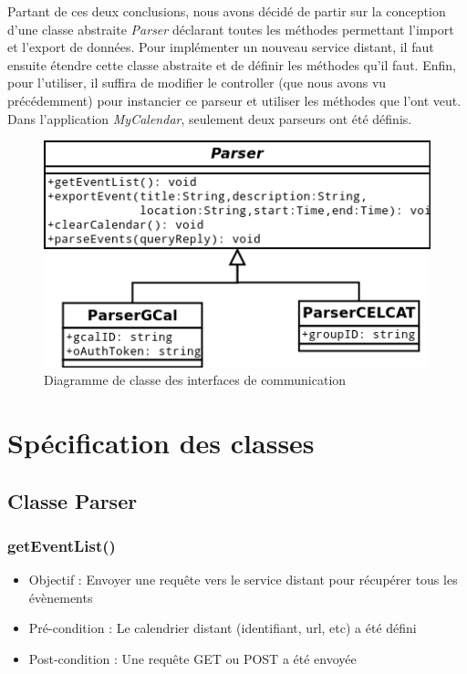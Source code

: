 	Partant de ces deux conclusions, nous avons décidé de partir sur la conception d'une classe abstraite \emph{Parser} déclarant toutes les méthodes permettant l'import et l'export de données. Pour implémenter un nouveau service distant, il faut ensuite étendre cette classe abstraite et de définir les méthodes qu'il faut. Enfin, pour l'utiliser, il suffira de modifier le controller (que nous avons vu précédemment) pour instancier ce parseur et utiliser les méthodes que l'ont veut.\\
	
	Dans l'application \emph{MyCalendar}, seulement deux parseurs ont été définis.
	\begin{figure}[!h]
		\centering
		\includegraphics[scale=0.65]{diagclasses_parser.png}
		\caption{Diagramme de classe des interfaces de communication}
	\end{figure}
	\FloatBarrier
	
	\section{Spécification des classes}
		\subsection{Classe Parser}
			\subsubsection{getEventList()}
				\begin{itemize}
					\item Objectif  : Envoyer une requête vers le service distant pour récupérer tous les évènements
					\item Pré-condition : Le calendrier distant (identifiant, url, etc) a été défini
					\item Post-condition : Une requête GET ou POST a été envoyée
				\end{itemize}
				
